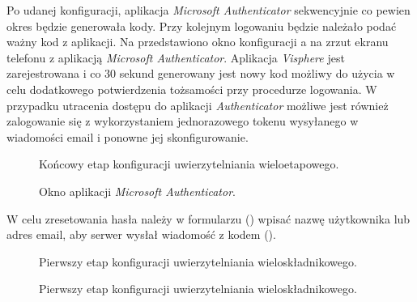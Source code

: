 Po udanej konfiguracji, aplikacja \textit{Microsoft Authenticator} sekwencyjnie co pewien okres będzie generowała kody.
Przy kolejnym logowaniu będzie należało podać ważny kod z aplikacji. Na  przedstawiono
okno konfiguracji a na  zrzut ekranu telefonu z aplikacją \textit{Microsoft
  Authenticator}. Aplikacja \textit{Visphere} jest zarejestrowana i co 30 sekund generowany jest nowy kod możliwy do
użycia w celu dodatkowego potwierdzenia tożsamości przy procedurze logowania. W przypadku utracenia dostępu do aplikacji
\textit{Authenticator} możliwe jest również zalogowanie się z wykorzystaniem jednorazowego tokenu wysyłanego w
wiadomości email i ponowne jej skonfigurowanie.
%
\begin{figure}[H]
  \centering
  \caption{Końcowy etap konfiguracji uwierzytelniania wieloetapowego.}
  \label{fig:mfa-settings-third}
\end{figure}
%
\begin{figure}[H]
  \centering
  \caption{Okno aplikacji \textit{Microsoft Authenticator}.}
  \label{fig:mfa-authenticator-app}
\end{figure}


W celu zresetowania hasła należy w formularzu () wpisać nazwę użytkownika lub adres email,
aby serwer wysłał wiadomość z kodem ().
%
\begin{figure}[H]
  \centering
  \begin{subfigure}[b]{0.45\textwidth}
    \centering
  \end{subfigure}
  \hfill
  \begin{subfigure}[b]{0.45\textwidth}
    \centering
  \end{subfigure}
  \caption{Pierwszy etap konfiguracji uwierzytelniania wieloskładnikowego.}
  \label{fig:password-reset}
\end{figure}
%
\begin{figure}[H]
  \centering
  \begin{subfigure}[b]{0.45\textwidth}
    \centering
  \end{subfigure}
  \hfill
  \begin{subfigure}[b]{0.45\textwidth}
    \centering
  \end{subfigure}
  \caption{Pierwszy etap konfiguracji uwierzytelniania wieloskładnikowego.}
  \label{fig:password-reset-change}
\end{figure}

